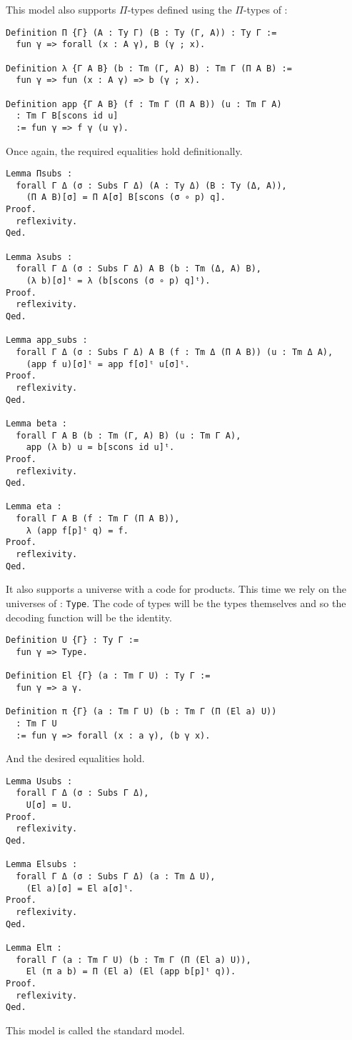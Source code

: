 This model also supports \(\Pi\)-types defined using the \(\Pi\)-types of
\Coq:
\begin{verbatim}
Definition Π {Γ} (A : Ty Γ) (B : Ty (Γ, A)) : Ty Γ :=
  fun γ => forall (x : A γ), B (γ ; x).

Definition λ {Γ A B} (b : Tm (Γ, A) B) : Tm Γ (Π A B) :=
  fun γ => fun (x : A γ) => b (γ ; x).

Definition app {Γ A B} (f : Tm Γ (Π A B)) (u : Tm Γ A)
  : Tm Γ B[scons id u]
  := fun γ => f γ (u γ).
\end{verbatim}

Once again, the required equalities hold definitionally.
\begin{verbatim}
Lemma Πsubs :
  forall Γ Δ (σ : Subs Γ Δ) (A : Ty Δ) (B : Ty (Δ, A)),
    (Π A B)[σ] = Π A[σ] B[scons (σ ∘ p) q].
Proof.
  reflexivity.
Qed.

Lemma λsubs :
  forall Γ Δ (σ : Subs Γ Δ) A B (b : Tm (Δ, A) B),
    (λ b)[σ]ᵗ = λ (b[scons (σ ∘ p) q]ᵗ).
Proof.
  reflexivity.
Qed.

Lemma app_subs :
  forall Γ Δ (σ : Subs Γ Δ) A B (f : Tm Δ (Π A B)) (u : Tm Δ A),
    (app f u)[σ]ᵗ = app f[σ]ᵗ u[σ]ᵗ.
Proof.
  reflexivity.
Qed.

Lemma beta :
  forall Γ A B (b : Tm (Γ, A) B) (u : Tm Γ A),
    app (λ b) u = b[scons id u]ᵗ.
Proof.
  reflexivity.
Qed.

Lemma eta :
  forall Γ A B (f : Tm Γ (Π A B)),
    λ (app f[p]ᵗ q) = f.
Proof.
  reflexivity.
Qed.
\end{verbatim}

It also supports a universe with a code for products. This time we rely on
the universes of \Coq: \texttt{Type}.
The code of types will be the types themselves and so the decoding function
will be the identity.
\begin{verbatim}
Definition U {Γ} : Ty Γ :=
  fun γ => Type.

Definition El {Γ} (a : Tm Γ U) : Ty Γ :=
  fun γ => a γ.

Definition π {Γ} (a : Tm Γ U) (b : Tm Γ (Π (El a) U))
  : Tm Γ U
  := fun γ => forall (x : a γ), (b γ x).
\end{verbatim}

And the desired equalities hold.
\begin{verbatim}
Lemma Usubs :
  forall Γ Δ (σ : Subs Γ Δ),
    U[σ] = U.
Proof.
  reflexivity.
Qed.

Lemma Elsubs :
  forall Γ Δ (σ : Subs Γ Δ) (a : Tm Δ U),
    (El a)[σ] = El a[σ]ᵗ.
Proof.
  reflexivity.
Qed.

Lemma Elπ :
  forall Γ (a : Tm Γ U) (b : Tm Γ (Π (El a) U)),
    El (π a b) = Π (El a) (El (app b[p]ᵗ q)).
Proof.
  reflexivity.
Qed.
\end{verbatim}

This model is called the standard model.

